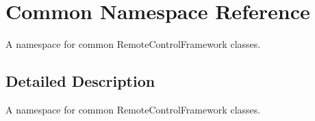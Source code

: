 \hypertarget{namespace_common}{}\section{Common Namespace Reference}
\label{namespace_common}


A namespace for common Remote\+Control\+Framework classes.  




\subsection{Detailed Description}
A namespace for common Remote\+Control\+Framework classes. 